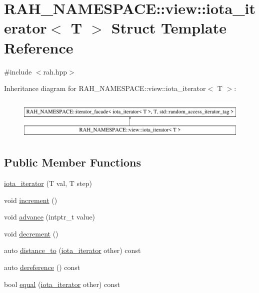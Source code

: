 \hypertarget{struct_r_a_h___n_a_m_e_s_p_a_c_e_1_1view_1_1iota__iterator}{}\section{R\+A\+H\+\_\+\+N\+A\+M\+E\+S\+P\+A\+CE\+::view\+::iota\+\_\+iterator$<$ T $>$ Struct Template Reference}
\label{struct_r_a_h___n_a_m_e_s_p_a_c_e_1_1view_1_1iota__iterator}


{\ttfamily \#include $<$rah.\+hpp$>$}

Inheritance diagram for R\+A\+H\+\_\+\+N\+A\+M\+E\+S\+P\+A\+CE\+::view\+::iota\+\_\+iterator$<$ T $>$\+:\begin{figure}[H]
\begin{center}
\leavevmode
\includegraphics[height=2.000000cm]{struct_r_a_h___n_a_m_e_s_p_a_c_e_1_1view_1_1iota__iterator}
\end{center}
\end{figure}
\subsection*{Public Member Functions}
\begin{DoxyCompactItemize}
\item 
\mbox{\hyperlink{struct_r_a_h___n_a_m_e_s_p_a_c_e_1_1view_1_1iota__iterator_afcc74aab3c4978aad0c72ba2ac508c8b}{iota\+\_\+iterator}} (T val, T step)
\item 
void \mbox{\hyperlink{struct_r_a_h___n_a_m_e_s_p_a_c_e_1_1view_1_1iota__iterator_ac0c50c65ebf999525aa8290bcc0800f3}{increment}} ()
\item 
void \mbox{\hyperlink{struct_r_a_h___n_a_m_e_s_p_a_c_e_1_1view_1_1iota__iterator_a9aef0086efe1cd3e4ffa07aa2e73915e}{advance}} (intptr\+\_\+t value)
\item 
void \mbox{\hyperlink{struct_r_a_h___n_a_m_e_s_p_a_c_e_1_1view_1_1iota__iterator_a3d1057926668d81a132743b7759b85f3}{decrement}} ()
\item 
auto \mbox{\hyperlink{struct_r_a_h___n_a_m_e_s_p_a_c_e_1_1view_1_1iota__iterator_aa31762f7d7101b2a7a8586099da1684d}{distance\+\_\+to}} (\mbox{\hyperlink{struct_r_a_h___n_a_m_e_s_p_a_c_e_1_1view_1_1iota__iterator}{iota\+\_\+iterator}} other) const
\item 
auto \mbox{\hyperlink{struct_r_a_h___n_a_m_e_s_p_a_c_e_1_1view_1_1iota__iterator_add7ead594ba726657ae900c4a3c7948c}{dereference}} () const
\item 
bool \mbox{\hyperlink{struct_r_a_h___n_a_m_e_s_p_a_c_e_1_1view_1_1iota__iterator_a8f88b6d69de47de4bbff275a7c11a8f7}{equal}} (\mbox{\hyperlink{struct_r_a_h___n_a_m_e_s_p_a_c_e_1_1view_1_1iota__iterator}{iota\+\_\+iterator}} other) const
\end{DoxyCompactItemize}
